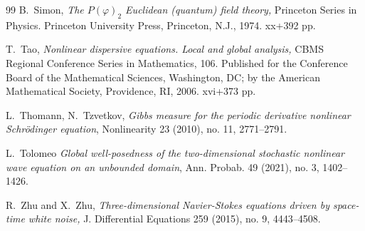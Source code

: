 \documentclass[%
11pt,  reqno]{amsart}
\newcommand{\1}{\hspace{0.2mm}\text{I}\hspace{0.2mm}}
\numberwithin{equation}{section}
\numberwithin{theorem}{section}
\begin{document}
\begin{thebibliography}{99}
B.~Simon, 
{\it  The $P(\varphi)_2$ Euclidean (quantum) field theory,} Princeton Series in Physics. Princeton University Press, Princeton, N.J., 1974. xx+392 pp.


T.~Tao, {\it Nonlinear dispersive equations. Local and global analysis,} CBMS Regional Conference Series in Mathematics, 106. Published for the Conference Board of the Mathematical Sciences, Washington, DC; by the American Mathematical Society, Providence, RI, 2006. xvi+373 pp.

L.~Thomann, N.~Tzvetkov, 
{\it Gibbs measure for the periodic derivative nonlinear Schr\"odinger equation},
 Nonlinearity 23 (2010), no. 11, 2771--2791.


L.~Tolomeo
{\it Global well-posedness of the two-dimensional stochastic nonlinear wave equation on an unbounded domain},
 Ann. Probab. 49 (2021), no. 3, 
 1402--1426.




R.~Zhu and X.~Zhu,
{\it Three-dimensional {Navier}-{Stokes} equations driven by space-time
  white noise,}
 J. Differential Equations 259 (2015), no. 9, 4443--4508.


\end{thebibliography}
\end{document}
